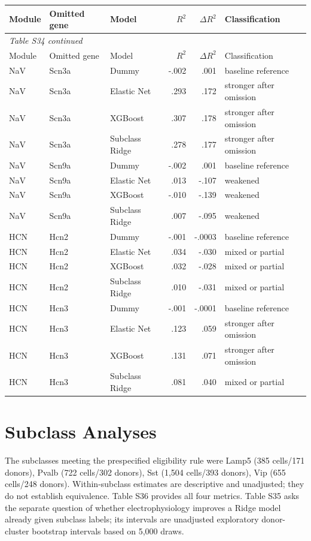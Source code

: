 \documentclass[11pt]{article}
\newcommand{\tablefont}{\fontsize{9.5}{11.2}\selectfont}
\newcommand{\sourcecaption}[1]{\Needspace{10\baselineskip}\vspace{2pt}{\small\bfseries #1}\par\vspace{2pt}}
\begin{document}
\sourcecaption{Leave-one-gene-out sensitivity under the 24-feature reference specification (Table S34).}
{\tablefont
\begin{longtable}{@{}lllrrl@{}}
\toprule
Module & Omitted gene & Model & $R^2$ & $\Delta R^2$ & Classification \\
\midrule
\endfirsthead
\multicolumn{6}{l}{\small\itshape Table S34 continued}\\[2pt]
\toprule
Module & Omitted gene & Model & $R^2$ & $\Delta R^2$ & Classification \\
\midrule
\endhead
NaV & Scn3a & Dummy & -.002 & .001 & baseline reference \\
NaV & Scn3a & Elastic Net & .293 & .172 & stronger after omission \\
NaV & Scn3a & XGBoost & .307 & .178 & stronger after omission \\
NaV & Scn3a & Subclass Ridge & .278 & .177 & stronger after omission \\
NaV & Scn9a & Dummy & -.002 & .001 & baseline reference \\
NaV & Scn9a & Elastic Net & .013 & -.107 & weakened \\
NaV & Scn9a & XGBoost & -.010 & -.139 & weakened \\
NaV & Scn9a & Subclass Ridge & .007 & -.095 & weakened \\
HCN & Hcn2 & Dummy & -.001 & -.0003 & baseline reference \\
HCN & Hcn2 & Elastic Net & .034 & -.030 & mixed or partial \\
HCN & Hcn2 & XGBoost & .032 & -.028 & mixed or partial \\
HCN & Hcn2 & Subclass Ridge & .010 & -.031 & mixed or partial \\
HCN & Hcn3 & Dummy & -.001 & -.0001 & baseline reference \\
HCN & Hcn3 & Elastic Net & .123 & .059 & stronger after omission \\
HCN & Hcn3 & XGBoost & .131 & .071 & stronger after omission \\
HCN & Hcn3 & Subclass Ridge & .081 & .040 & mixed or partial \\
\bottomrule
\end{longtable}}

\section{Subclass Analyses}
The subclasses meeting the prespecified eligibility rule were Lamp5 (385 cells/171 donors), Pvalb (722 cells/302 donors), Sst (1,504 cells/393 donors), Vip (655 cells/248 donors). Within-subclass estimates are descriptive and unadjusted; they do not establish equivalence. Table S36 provides all four metrics. Table S35 asks the separate question of whether electrophysiology improves a Ridge model already given subclass labels; its intervals are unadjusted exploratory donor-cluster bootstrap intervals based on 5,000 draws.
\end{document}
